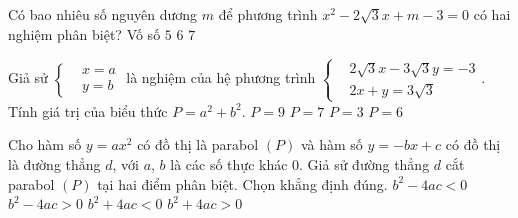 \begin{ex}%
Có bao nhiêu số nguyên dương $m$ để phương trình $x^2-2\sqrt{3}x+m-3=0$ có hai nghiệm phân biệt?
\choice
{Vố số}
{\True $5$}
{$6$}
{$7$}
\end{ex}

\begin{ex}%
Giả sử $\left\{\begin{aligned} &x=a\\ &y=b \end{aligned}\right.$ là nghiệm của hệ phương trình $\left\{\begin{aligned} &2\sqrt{3}x-3\sqrt{3}y=-3\\ &2x+y=3\sqrt{3}\end{aligned}\right.$. Tính giá trị của biểu thức $P=a^2+b^2$.
\choice
{$P=9$}
{$P=7$}
{$P=3$}
{\True $P=6$}
\end{ex}

\begin{ex}%
Cho hàm số $y=ax^2$ có đồ thị là parabol $(P)$ và hàm số $y=-bx+c$ có đồ thị là đường thẳng $d$, với $a$, $b$ là các số thực khác $0$. Giả sử đường thẳng $d$ cắt parabol $(P)$ tại hai điểm phân biệt. Chọn khẳng định đúng.
\choice
{$b^2-4ac<0$}
{$b^2-4ac>0$}
{$b^2+4ac<0$}
{\True $b^2+4ac>0$}
\end{ex}

